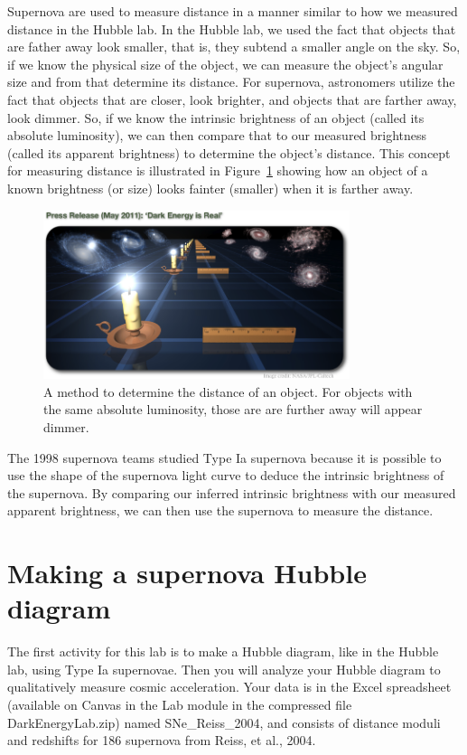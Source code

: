 Supernova are used to measure distance in a manner similar to how we
measured distance in the Hubble lab. In the Hubble lab, we used the fact
that objects that are father away look smaller, that is, they subtend a
smaller angle on the sky. So, if we know the physical size of the object,
we can measure the object’s angular size and from that determine its
distance. For supernova, astronomers utilize the fact that objects that
are closer, look brighter, and objects that are farther away, look dimmer.
So, if we know the intrinsic brightness of an object (called its absolute
luminosity), we can then compare that to our measured brightness
(called its apparent brightness) to determine the object’s distance. This
concept for measuring distance is illustrated in Figure~\ref{de:fig:candles} showing how an object of a known brightness (or size) looks fainter
(smaller) when it is farther away.

\begin{figure}
	\centering
	\includegraphics[width=0.8\textwidth]{dark-energy/candles}
	\caption{A method to determine the distance of an object. For objects with the same absolute luminosity, those are are further away will appear dimmer.}\label{de:fig:candles}
\end{figure}

The 1998 supernova teams studied Type Ia supernova because it is
possible to use the shape of the supernova light curve to deduce the
intrinsic brightness of the supernova. By comparing our inferred
intrinsic brightness with our measured apparent brightness, we can
then use the supernova to measure the distance.

\section{Making a supernova Hubble diagram}

The first activity for this lab is to make a Hubble diagram, like in the
Hubble lab, using Type Ia supernovae. Then you will analyze your Hubble diagram to qualitatively measure cosmic acceleration. Your data is in the Excel spreadsheet (available on Canvas in the Lab module in the compressed file DarkEnergyLab.zip) named SNe\_Reiss\_2004, and consists of distance moduli
and redshifts for 186 supernova from Reiss, et al., 2004.

